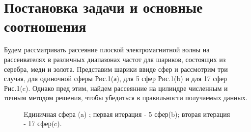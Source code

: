 \section{Постановка задачи и основные соотношения}
Будем рассматривать рассеяние плоской электромагнитной волны на рассеивателях в различных диапазонах частот для шариков, состоящих из серебра, меди и золота. Представим шарики ввиде сфер и рассмотрим три случая, для одиночной сферы Рис.1(а), для 5 сфер Рис.1(b) и для 17 сфер Рис.1(c). Однако пред этим, найдем рассеянние на цилиндре численным и точным методом решения, чтобы убедиться в правильности получаемых данных. \\
\begin{figure}[ht!]  
	\vspace{-4ex} \centering {}  
	\hspace{4ex}
	\hspace{4ex}
	\caption{Eдиничная сфера (a) ; первая итерация - 5 сфер(b); вторая итерация - 17 сфер(c).} 
	\label{fig:qqq}
\end{figure} \\
